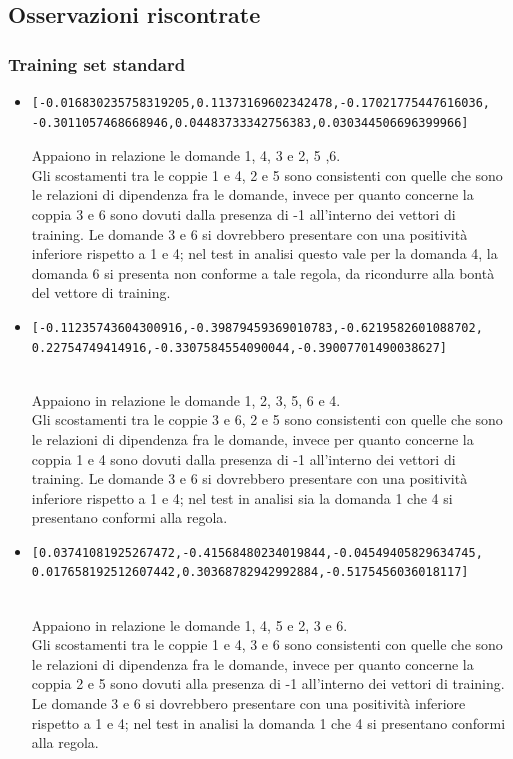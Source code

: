 \documentclass[10pt,a4paper]{article}
\begin{document}
\subsection{Osservazioni riscontrate}
\label{Osservazioni riscontrate}

\subsubsection{Training set standard}
\label{Training set standard}
\begin{itemize}
\item \begin{verbatim}[-0.016830235758319205,0.11373169602342478,-0.17021775447616036,
-0.3011057468668946,0.04483733342756383,0.030344506696399966] \end{verbatim}
Appaiono in relazione le domande 1, 4, 3 e 2, 5 ,6.\\
Gli scostamenti tra le coppie 1 e 4, 2 e 5 sono consistenti con quelle che sono le relazioni  di dipendenza fra le domande, invece per quanto concerne la coppia 3 e 6 sono dovuti dalla presenza di -1  all'interno dei vettori di training.
Le domande 3 e 6 si dovrebbero presentare con una positivit\`a inferiore rispetto a 1 e 4; nel test in analisi questo vale per la domanda 4, la domanda 6 si presenta non conforme a tale regola, da ricondurre alla bont\`a del vettore di training.

\item \begin{verbatim}[-0.11235743604300916,-0.39879459369010783,-0.6219582601088702,
0.22754749414916,-0.3307584554090044,-0.39007701490038627] \end{verbatim}\\
Appaiono in relazione le domande 1, 2, 3, 5, 6 e 4.\\
Gli scostamenti tra le coppie 3 e 6, 2 e 5 sono consistenti con quelle che sono le relazioni di dipendenza fra le domande, invece per quanto concerne la coppia 1 e 4 sono dovuti dalla presenza di -1  all'interno dei vettori di training.
Le domande 3 e 6 si dovrebbero presentare con una positivit\`a inferiore rispetto a 1 e 4; nel test in analisi sia la domanda 1 che 4 si presentano conformi alla regola.

\item \begin{verbatim}[0.03741081925267472,-0.41568480234019844,-0.04549405829634745,
0.017658192512607442,0.30368782942992884,-0.5175456036018117] \end{verbatim}\\
Appaiono in relazione le domande 1, 4, 5 e 2, 3 e 6.\\
Gli scostamenti tra le coppie 1 e 4, 3 e 6 sono consistenti con quelle che sono le relazioni di dipendenza fra le domande, invece per quanto concerne la coppia 2 e 5 sono dovuti alla presenza di -1 all'interno dei vettori di training.
Le domande 3 e 6 si dovrebbero presentare con una positivit\`a inferiore rispetto a 1 e 4; nel test in analisi la domanda 1 che 4 si presentano conformi alla regola.


\end{itemize}
\end{document}

